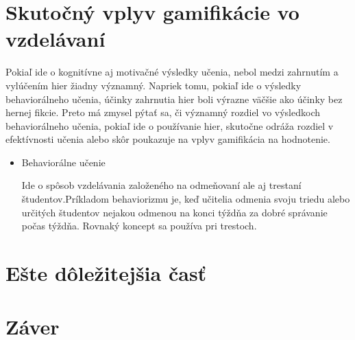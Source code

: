 \documentclass[10pt,twoside,slovak,a4paper]{article}
\begin{document}
\section{Skutočný vplyv gamifikácie vo vzdelávaní} 
Pokiaľ ide o kognitívne aj motivačné výsledky učenia, nebol medzi zahrnutím a vylúčením hier žiadny významný. Napriek tomu, pokiaľ ide o výsledky behaviorálneho učenia, účinky zahrnutia hier boli výrazne väčšie ako účinky bez hernej fikcie. Preto má zmysel pýtať sa, či významný rozdiel vo výsledkoch behaviorálneho učenia, pokiaľ ide o používanie hier, skutočne odráža rozdiel v efektívnosti učenia alebo skôr poukazuje na vplyv gamifikácia na hodnotenie.

\begin{itemize}
    \item Behaviorálne učenie

Ide o spôsob vzdelávania založeného na odmeňovaní ale aj trestaní študentov.Príkladom behaviorizmu je, keď učitelia odmenia svoju triedu alebo určitých študentov nejakou odmenou na konci týždňa za dobré správanie počas týždňa. Rovnaký koncept sa používa pri trestoch.
\end{itemize}
\section{Ešte dôležitejšia časť} \label{dolezitejsia}




\section{Záver} \label{zaver} %






\end{document}
